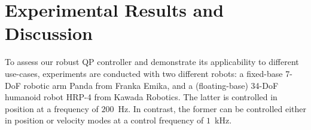 
\section{Experimental Results and Discussion}\label{sec-chap3:Experiments}
To assess our robust QP controller and demonstrate its applicability to different use-cases, experiments are conducted with two different robots: a fixed-base 7-DoF robotic arm Panda from Franka Emika, and a (floating-base) 34-DoF humanoid robot HRP-4 from Kawada Robotics. The latter is controlled in position at a frequency of $200$~Hz. In contrast, the former can be controlled either in position or velocity modes at a control frequency of $1$~kHz. 


